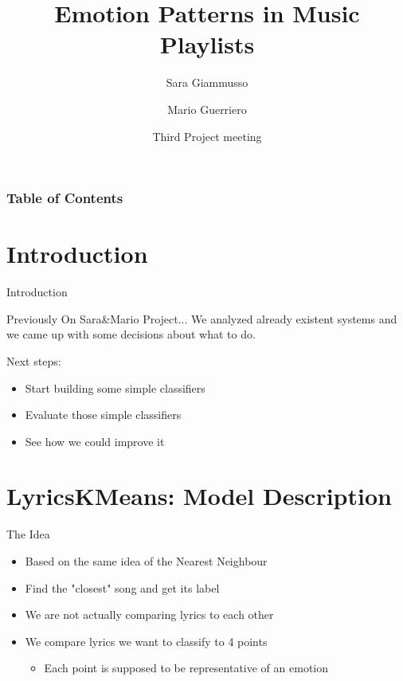 \documentclass[xcolor=dvipsnames]{beamer}
\title[Emotion Patterns in Music Playlists] %
{Emotion Patterns in Music Playlists}
\author[Sara, Mario] %
{Sara Giammusso\inst{1}\inst{2} \and Mario Guerriero \inst{1}\inst{2}}
\institute[EURECOM] %
{
 \inst{1}
 MSc student in Data Science Department, EURECOM, T\'el\'ecom ParisTech, France\\
  \inst{2}%
 MSc student in Department of Control and Computer Engineering, Politecnico di Torino, Italy
}
\date[2018 April 5] %
{Third Project meeting}
\begin{document}
\frame{\titlepage}

\begin{frame}
\frametitle{Table of Contents}
\tableofcontents
\end{frame}

\section{Introduction}
\begin{frame}{Introduction}
\begin{block}{Previously On Sara\&Mario Project...}
We analyzed already existent systems and we came up with some decisions about what to do.\\
\end{block}
Next steps:
\begin{itemize}
\item Start building some simple classifiers
\item Evaluate those simple classifiers
\item See how we could improve it
\end{itemize}
\end{frame}

\section{LyricsKMeans: Model Description}

\begin{frame}{The Idea}
\begin{itemize}
\item Based on the same idea of the Nearest Neighbour
\item Find the "closest" song and get its label
\item We are not actually comparing lyrics to each other
\item We compare lyrics we want to classify to 4 points
\begin{itemize}
\item Each point is supposed to be representative of an emotion
\end{itemize}
\end{itemize}
\end{frame}
\end{document}
